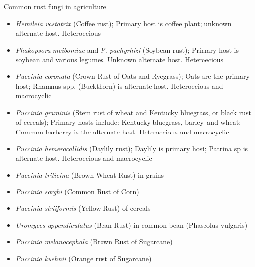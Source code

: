 \documentclass[10pt,dvipsnames,ignorenonframetext,aspectratio=169]{beamer}
\providecommand{\tightlist}{%
  \setlength{\itemsep}{0pt}\setlength{\parskip}{0pt}}
\begin{document}
\begin{frame}{Common rust fungi in agriculture}
\protect\hypertarget{common-rust-fungi-in-agriculture}{}
\begin{itemize}
\tightlist
\item
  \emph{Hemileia vastatrix} (Coffee rust); Primary host is coffee plant;
  unknown alternate host. Heteroecious
\item
  \emph{Phakopsora meibomiae} and \emph{P. pachyrhizi} (Soybean rust);
  Primary host is soybean and various legumes. Unknown alternate host.
  Heteroecious
\item
  \emph{Puccinia coronata} (Crown Rust of Oats and Ryegrass); Oats are
  the primary host; Rhamnus spp. (Buckthorn) is alternate host.
  Heteroecious and macrocyclic
\item
  \emph{Puccinia graminis} (Stem rust of wheat and Kentucky bluegrass,
  or black rust of cereals); Primary hosts include: Kentucky bluegrass,
  barley, and wheat; Common barberry is the alternate host. Heteroecious
  and macrocyclic
\item
  \emph{Puccinia hemerocallidis} (Daylily rust); Daylily is primary
  host; Patrina sp is alternate host. Heteroecious and macrocyclic
\item
  \emph{Puccinia triticina} (Brown Wheat Rust) in grains
\item
  \emph{Puccinia sorghi} (Common Rust of Corn)
\item
  \emph{Puccinia striiformis} (Yellow Rust) of cereals
\item
  \emph{Uromyces appendiculatus} (Bean Rust) in common bean (Phaseolus
  vulgaris)
\item
  \emph{Puccinia melanocephala} (Brown Rust of Sugarcane)
\item
  \emph{Puccinia kuehnii} (Orange rust of Sugarcane)
\end{itemize}
\end{frame}
\end{document}
